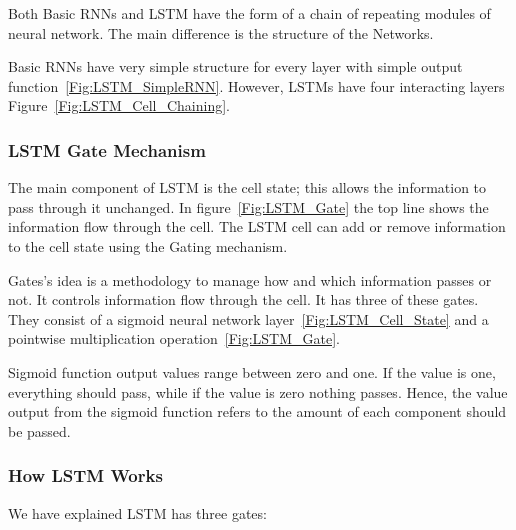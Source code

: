 Both Basic RNNs and LSTM have the form of a chain of repeating modules of neural network. The main difference is the structure of the Networks.%

Basic RNNs have very simple structure for every layer with simple output function~\ref{Fig:LSTM_SimpleRNN}. However, LSTMs have four interacting layers Figure~\ref{Fig:LSTM_Cell_Chaining}.

\subsubsection{LSTM Gate Mechanism}

The main component of LSTM is the cell state; this allows the information to pass through it unchanged. In figure~\ref{Fig:LSTM_Gate} the top line shows the information flow through the cell. The LSTM cell can add or remove information to the cell state using the Gating mechanism. 

Gates's idea is a methodology to manage how and which information passes or not. It controls information flow through the cell. It has three of these gates. They consist of a sigmoid neural network layer~\ref{Fig:LSTM_Cell_State} and a pointwise multiplication operation~\ref{Fig:LSTM_Gate}.

Sigmoid function output values range between zero and one. If the value is one, everything should pass, while if the value is zero nothing passes. Hence, the value output from the sigmoid function refers to the amount of each component should be passed.%

\subsubsection{How LSTM Works}

We have explained LSTM has three gates:

